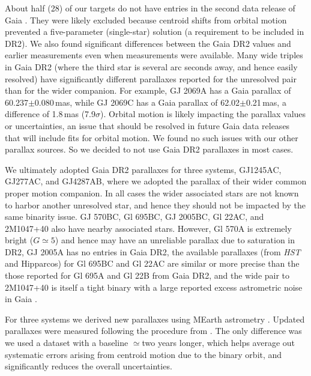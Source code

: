 \documentclass[twocolumn]{aastex62}
\begin{document}
About half (28) of our targets do not have entries in the second data release of Gaia \citep[DR2, ][]{GaiaDr2,2018arXiv180409365G}. They were likely excluded because centroid shifts from orbital motion prevented a five-parameter (single-star) solution (a requirement to be included in DR2). We also found significant differences between the Gaia DR2 values and earlier measurements \citep[including from TGAS, ][]{2015A&A...574A.115M,gaiadr1} even when measurements were available. Many wide triples in Gaia DR2 (where the third star is several arc seconds away, and hence easily resolved) have significantly different parallaxes reported for the unresolved pair than for the wider companion. For example, GJ 2069A has a Gaia parallax of 60.237$\pm$0.080\,mas, while GJ 2069C has a Gaia  parallax of 62.02$\pm$0.21\,mas, a difference of 1.8\,mas (7.9$\sigma$). Orbital motion is likely impacting the parallax values or uncertainties, an issue that should be resolved in future Gaia data releases that will include fits for orbital motion. We found no such issues with our other parallax sources. So we decided to not use Gaia DR2 parallaxes in most cases. 

We ultimately adopted Gaia DR2 parallaxes for three systems, GJ1245AC, GJ277AC, and GJ4287AB, where we adopted the parallax of their wider common proper motion companion. In all cases the wider associated stars are not known to harbor another unresolved star, and hence they should not be impacted by the same binarity issue. GJ 570BC, Gl 695BC, GJ 2005BC, Gl 22AC, and 2M1047+40 also have nearby associated stars. However, Gl 570A is extremely bright ($G\simeq5$) and hence may have an unreliable parallax due to saturation in DR2, GJ 2005A has no entries in Gaia DR2, the available parallaxes (from {\it HST} and Hipparcos) for Gl 695BC and Gl 22AC are similar or more precise than the those reported for Gl 695A and Gl 22B from Gaia DR2, and the wide pair to 2M1047+40 is itself a tight binary \citep[LP 213-67AB,][]{Dupuy2017} with a large reported excess astrometric noise in Gaia \citep[a sign of binarity,][]{2018RNAAS...2...20E}.

For three systems we derived new parallaxes using MEarth astrometry \citep{Nutzman:2008gf}. Updated parallaxes were measured following the procedure from \citet{2014ApJ...784..156D}. The only difference was we used a dataset with a baseline $\simeq$two years longer, which helps average out systematic errors arising from centroid motion due to the binary orbit, and significantly reduces the overall uncertainties. 
\end{document}

